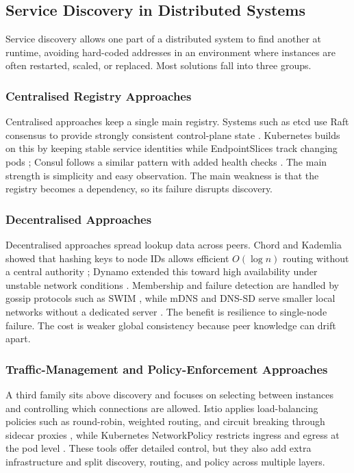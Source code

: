 \documentclass[10pt,a4paper]{article}
\begin{document}
\subsection{Service Discovery in Distributed Systems}

Service discovery allows one part of a distributed system to find another at runtime, avoiding hard-coded addresses in an environment where instances are often restarted, scaled, or replaced. Most solutions fall into three groups.

\subsubsection{Centralised Registry Approaches}

Centralised approaches keep a single main registry. Systems such as etcd use Raft consensus to provide strongly consistent control-plane state \cite{etcd,raft,etcdapi}. Kubernetes builds on this by keeping stable service identities while EndpointSlices track changing pods \cite{k8sservice}; Consul follows a similar pattern with added health checks \cite{consul,consuldocs}. The main strength is simplicity and easy observation. The main weakness is that the registry becomes a dependency, so its failure disrupts discovery.

\subsubsection{Decentralised Approaches}

Decentralised approaches spread lookup data across peers. Chord and Kademlia showed that hashing keys to node IDs allows efficient $O(\log n)$ routing without a central authority \cite{chord,kademlia}; Dynamo extended this toward high availability under unstable network conditions \cite{dynamo}. Membership and failure detection are handled by gossip protocols such as SWIM \cite{swim}, while mDNS and DNS-SD serve smaller local networks without a dedicated server \cite{mdns,dnssd}. The benefit is resilience to single-node failure. The cost is weaker global consistency because peer knowledge can drift apart.

\subsubsection{Traffic-Management and Policy-Enforcement Approaches}

A third family sits above discovery and focuses on selecting between instances and controlling which connections are allowed. Istio applies load-balancing policies such as round-robin, weighted routing, and circuit breaking through sidecar proxies \cite{istio}, while Kubernetes NetworkPolicy restricts ingress and egress at the pod level \cite{k8snetworkpolicy}. These tools offer detailed control, but they also add extra infrastructure and split discovery, routing, and policy across multiple layers.
\end{document}
